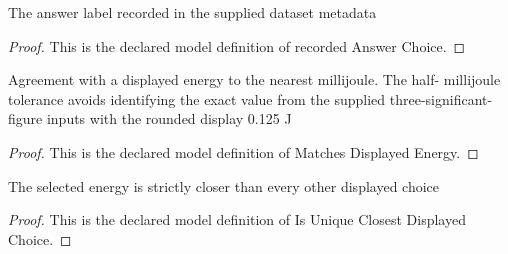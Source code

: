 \begin{definition}
  \label{def:physics:phyx-mini-0226:phyxminiproblems-problemphyxmini0226-recordedanswerchoice}
  The answer label recorded in the supplied dataset metadata
\end{definition}
\begin{proof}
  This is the declared model definition of recorded Answer Choice.
\end{proof}
\begin{definition}
  \label{def:physics:phyx-mini-0226:phyxminiproblems-problemphyxmini0226-matchesdisplayedenergy}
  Agreement with a displayed energy to the nearest millijoule. The half- millijoule tolerance avoids identifying the exact value from the supplied three-significant-figure inputs with the rounded display 0.125 J
\end{definition}
\begin{proof}
  This is the declared model definition of Matches Displayed Energy.
\end{proof}
\begin{definition}
  \label{def:physics:phyx-mini-0226:phyxminiproblems-problemphyxmini0226-isuniqueclosestdisplayedchoice}
  The selected energy is strictly closer than every other displayed choice
\end{definition}
\begin{proof}
  This is the declared model definition of Is Unique Closest Displayed Choice.
\end{proof}
